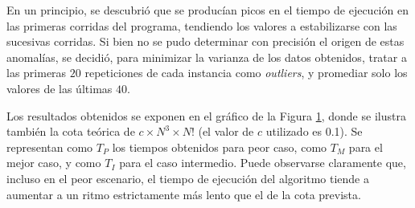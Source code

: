             En un principio, se descubrió que se producían picos en el tiempo de ejecución en las primeras corridas del programa, tendiendo los valores a estabilizarse con las sucesivas corridas. Si bien no se pudo determinar con precisión el origen de estas anomalías, se decidió, para minimizar la varianza de los datos obtenidos, tratar a las primeras $20$ repeticiones de cada instancia como \emph{outliers}, y promediar solo los valores de las últimas $40$.

            \renewcommand\constante{0.1}

            Los resultados obtenidos se exponen en el gráfico de la Figura \ref{fig:exp3:part_tiempo_base}, donde se ilustra también la cota teórica de $c \times N^3 \times N!$ (el valor de $c$ utilizado es \constante). Se representan como $T_P$ los tiempos obtenidos para peor caso, como $T_M$ para el mejor caso, y como $T_I$ para el caso intermedio. Puede observarse claramente que, incluso en el peor escenario, el tiempo de ejecución del algoritmo tiende a aumentar a un ritmo estrictamente más lento que el de la cota prevista.

            \begin{figure}[H]
                \centering
                \caption{}
                \label{fig:exp3:part_tiempo_base}
            \end{figure}

